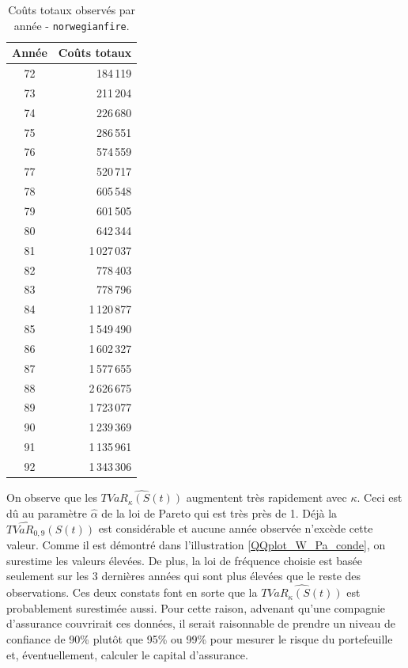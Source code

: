 		\begin{table}[H]
			\centering
				\begin{tabular}{|c|r|}
					\hline
					Année & Coûts totaux \\ \hline
					 72   &     184\,119 \\
					 73   &     211\,204 \\
					 74   &     226\,680 \\
					 75   &     286\,551 \\
					 76   &     574\,559 \\
					 77   &     520\,717 \\
					 78   &     605\,548 \\
					 79   &     601\,505 \\
					 80   &     642\,344 \\
					 81   &  1\,027\,037 \\
					 82   &     778\,403 \\
					 83   &     778\,796 \\
					 84   &  1\,120\,877 \\
					 85   &  1\,549\,490 \\
					 86   &  1\,602\,327 \\
					 87   &  1\,577\,655 \\
					 88   &  2\,626\,675 \\
					 89   &  1\,723\,077 \\
					 90   &  1\,239\,369 \\
					 91   &  1\,135\,961 \\
					 92   &  1\,343\,306 \\ \hline
				\end{tabular}
				\renewcommand{\tablename}{Tableau}
				\caption{Coûts totaux observés par année - \texttt{norwegianfire}.}\label{TAB_COUT_OBS_NF}
		\end{table}
	
		\begin{sloppypar} On observe que les $\widehat{TVaR_{\kappa}(S(t))}$ augmentent très rapidement avec $\kappa$. Ceci est dû au paramètre $\hat{\alpha}$ de la loi de Pareto qui est très près de 1. Déjà la $\widehat{TVaR_{0,9}}(S(t))$ est considérable et aucune année observée n'excède cette valeur. Comme il est démontré dans l'illustration \ref{QQplot_W_Pa_conde}, on surestime les valeurs élevées. De plus, la loi de fréquence choisie est basée seulement sur les 3 dernières années qui sont plus élevées que le reste des observations. Ces deux constats font en sorte que la $\widehat{TVaR_{\kappa}(S(t))}$ est probablement surestimée aussi. Pour cette raison, advenant qu'une compagnie d'assurance couvrirait ces données, il serait raisonnable de prendre un niveau de confiance de 90\% plutôt que 95\% ou 99\% pour mesurer le risque du portefeuille et, éventuellement, calculer le capital d'assurance.
		\end{sloppypar}	
	
